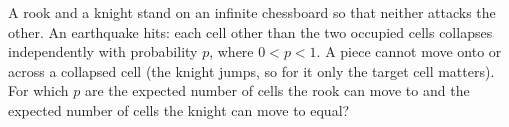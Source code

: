 A rook and a knight stand on an infinite chessboard so that neither attacks the other. An earthquake hits: each cell other than the two occupied cells collapses independently with probability $p$, where $0<p<1$. A piece cannot move onto or across a collapsed cell (the knight jumps, so for it only the target cell matters). For which $p$ are the expected number of cells the rook can move to and the expected number of cells the knight can move to equal?
